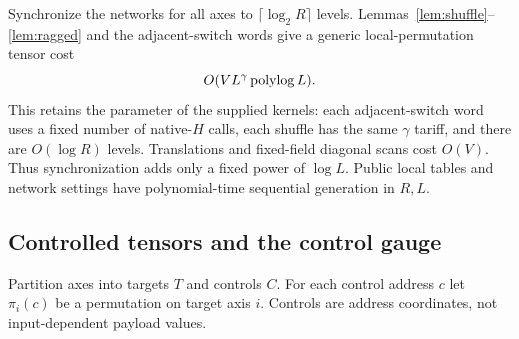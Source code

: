 Synchronize the networks for all axes to $\lceil\log_2R\rceil$ levels.
Lemmas~\ref{lem:shuffle}--\ref{lem:ragged} and the adjacent-switch
words give a generic local-permutation tensor cost
\begin{equation}
 \label{eq:generic}
 O(VL^\gamma\operatorname{polylog} L).
\end{equation}
This retains the parameter of the supplied kernels: each adjacent-switch
word uses a fixed number of native-$H$ calls, each shuffle has the
same $\gamma$ tariff, and there are $O(\log R)$ levels. Translations
and fixed-field diagonal scans cost $O(V)$. Thus synchronization adds
only a fixed power of $\log L$. Public local tables and network
settings have polynomial-time sequential generation in $R,L$.

\subsection{Controlled tensors and the control gauge}

Partition axes into targets $T$ and controls $C$. For each control
address $c$ let $\pi_i(c)$ be a permutation on target axis $i$.
Controls are address coordinates, not input-dependent payload values.

